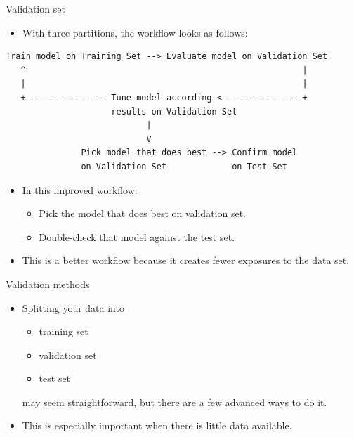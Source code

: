 \documentclass{beamer}
\begin{document}
\begin{frame}[fragile]{Validation set}
\begin{itemize}
\item With three partitions, the workflow looks as follows:
\end{itemize}
{\footnotesize
\begin{verbatim}
Train model on Training Set --> Evaluate model on Validation Set
   ^                                                       |
   |                                                       |   
   +---------------- Tune model according <----------------+ 
                     results on Validation Set
                            |
                            V
               Pick model that does best --> Confirm model 
               on Validation Set             on Test Set
\end{verbatim}
}
\begin{itemize}
\item In this improved workflow:
\begin{itemize}
\item Pick the model that does best on validation set.
\item Double-check that model against the test set.
\end{itemize}
\item This is a better workflow because it creates fewer exposures to the data set.
\end{itemize}
\end{frame}

\begin{frame}{Validation methods}
\begin{itemize}
\item Splitting your data into
\begin{itemize}
\item training set
\item validation set
\item test set
\end{itemize}
may seem straightforward, but there are a few advanced ways to do it. 
\item This is especially important when there is little data available.
\end{itemize}
\end{frame}
\end{document}
